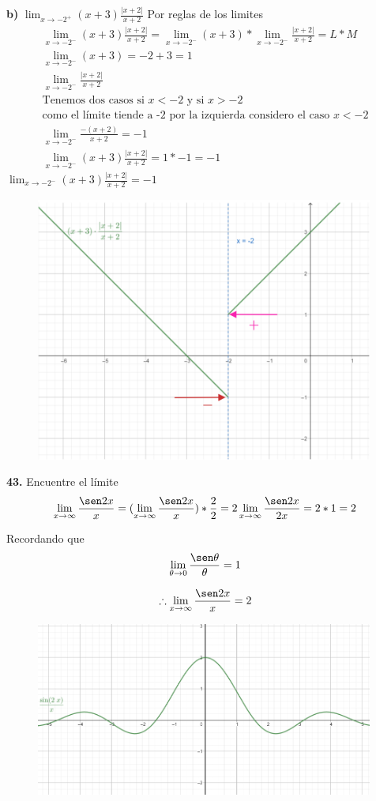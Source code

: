 \documentclass[12pt, letterpaper]{article}
\begin{document}
\textbf{b)} $\lim_{x \to -2^+} (x+3) \frac{|x+2|}{x+2}$ Por reglas de los limites 
\begin{align*}
	\lim_{x \to -2^-} (x+3) \frac{|x+2|}{x+2} = \lim_{x \to -2^-} (x+3) * \lim_{x \to -2^-} \frac{|x+2|}{x+2} = L * M\\
	\lim_{x \to -2^-} (x+3) = -2 +3 = 1  \\ 
	 \lim_{x \to -2^-} \frac{|x+2|}{x+2} \\
	\text{Tenemos dos casos si $x < -2$ y  si $x > -2$}\\
	\text{como  el límite tiende a -2 por la izquierda considero el caso $x < -2$}\\
	\lim_{x \to -2^-} \frac{-(x+2)}{x+2}=-1 \\
	\lim_{x \to -2^-} (x+3) \frac{|x+2|}{x+2} = 1 *-1 = -1
\end{align*}
$\lim_{x \to -2^-} (x+3) \frac{|x+2|}{x+2}=-1$ 

\begin{figure}[tbh]
\centering
\includegraphics[width=30em]{t11tres}
\end{figure}

\newpage
\textbf{43.} Encuentre el límite \\

$$\lim_{x \to \infty} \frac{\sen 2x}{x}= (\lim_{x \to \infty} \frac{\sen 2x}{x})*\frac{2}{2} = 2\lim_{x \to \infty} \frac{\sen 2x}{2x}= 2 *1 = 2$$ 

Recordando que $$\lim_{\theta \to 0} \frac{\sen \theta}{\theta}= 1$$ 

$$\therefore \lim_{x \to \infty} \frac{\sen 2x}{x} =2$$


\begin{figure}[tbh]
\centering
\includegraphics[width=30em]{t11cuatro}
\end{figure}
\end{document}
